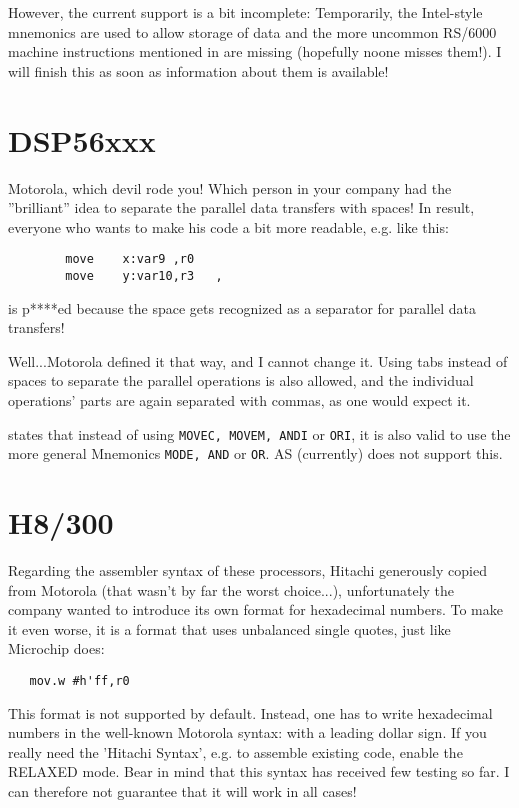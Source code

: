 \documentclass[12pt,twoside]{report}
\newcommand{\tty}[1]{{\tt #1}}
\begin{document}
However, the current support is a bit incomplete: Temporarily, the
Intel-style mnemonics are used to allow storage of data and the more
uncommon RS/6000 machine instructions mentioned in \cite{Mot601} are
missing (hopefully noone misses them!).  I will finish this as soon
as information about them is available!


\section{DSP56xxx}

Motorola, which devil rode you!  Which person in your company had the
''brilliant'' idea to separate the parallel data transfers with spaces!
In result, everyone who wants to make his code a bit more readable,
e.g. like this:
\begin{verbatim}
        move    x:var9 ,r0
        move    y:var10,r3   ,
\end{verbatim}
is p****ed because the space gets recognized as a separator for
parallel data transfers!

Well...Motorola defined it that way, and I cannot change it.  Using
tabs instead of spaces to separate the parallel operations is also
allowed, and the individual operations' parts are again separated
with commas, as one would expect it.

\cite{Mot56} states that instead of using \tty{MOVEC, MOVEM, ANDI} or
\tty{ORI}, it is also valid to use the more general Mnemonics \tty{MODE,
AND} or \tty{OR}.
AS (currently) does not support this.


\section{H8/300}

Regarding the assembler syntax of these processors, Hitachi generously
copied from Motorola (that wasn't by far the worst choice...),
unfortunately the company wanted to introduce its own format for
hexadecimal numbers.  To make it even worse, it is a format that uses
unbalanced single quotes, just like Microchip does:
\begin{verbatim}
   mov.w #h'ff,r0
\end{verbatim}
This format is not supported by default.  Instead, one has to write
hexadecimal numbers in the well-known Motorola syntax: with a leading
dollar sign.  If you really need the 'Hitachi Syntax', e.g. to assemble
existing code, enable the RELAXED mode.  Bear in mind that this syntax has
received few testing so far.  I can therefore not guarantee that it will
work in all cases!
\end{document}
